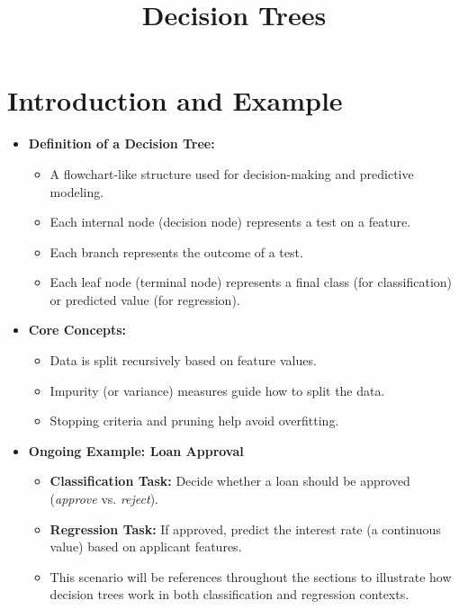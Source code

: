 \documentclass[10pt]{article}
\title{Decision Trees}
\author{}
\date{}
\begin{document}
\maketitle

\section{Introduction and Example}
\begin{itemize}
    \item \textbf{Definition of a Decision Tree:}
    \begin{itemize}
        \item A flowchart-like structure used for decision-making and predictive modeling.
        \item Each internal node (decision node) represents a test on a feature.
        \item Each branch represents the outcome of a test.
        \item Each leaf node (terminal node) represents a final class (for classification) or predicted value (for regression).
    \end{itemize}

    \item \textbf{Core Concepts:}
    \begin{itemize}
        \item Data is split recursively based on feature values.
        \item Impurity (or variance) measures guide how to split the data.
        \item Stopping criteria and pruning help avoid overfitting.
    \end{itemize}

    \item \textbf{Ongoing Example: Loan Approval}
    \begin{itemize}
        \item \textbf{Classification Task:} Decide whether a loan should be approved (\textit{approve} vs. \textit{reject}).
        \item \textbf{Regression Task:} If approved, predict the interest rate (a continuous value) based on applicant features.
        \item This scenario will be references throughout the sections to illustrate how decision trees work in both classification and regression contexts.
    \end{itemize}
\end{itemize}
\end{document}
